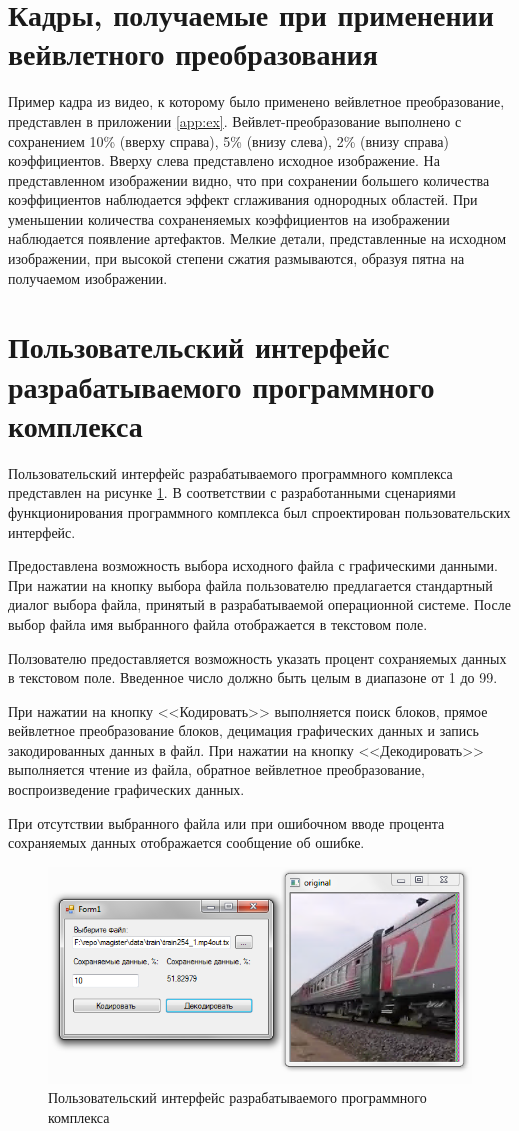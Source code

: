 \section{Кадры, получаемые при применении вейвлетного преобразования}
Пример кадра из видео, к которому было применено вейвлетное преобразование, представлен в приложении \ref{app:ex}.
Вейвлет-преобразование выполнено с сохранением 10\% (вверху справа), 5\% (внизу слева), 2\% (внизу справа) коэффициентов. 
Вверху слева представлено исходное изображение. На представленном изображении видно, что при сохранении большего количества коэффициентов
наблюдается эффект сглаживания однородных областей. При уменьшении количества сохраненяемых коэффициентов на изображении наблюдается появление 
артефактов. Мелкие детали, представленные на исходном изображении, при высокой степени сжатия размываются, образуя пятна на получаемом изображении.

\section{Пользовательский интерфейс разрабатываемого программного комплекса}
Пользовательский интерфейс разрабатываемого программного комплекса представлен на рисунке \ref{fig:ui}.
В соответствии с разработанными сценариями функционирования программного комплекса был спроектирован пользовательских интерфейс.

Предоставлена возможность выбора исходного файла с графическими данными. При нажатии на кнопку выбора файла пользователю предлагается 
стандартный диалог выбора файла, принятый в разрабатываемой операционной системе. После выбор файла имя выбранного файла отображается в 
текстовом поле. 

Ползователю предоставляется возможность указать процент сохраняемых данных в текстовом поле. Введенное число должно быть целым в диапазоне от 1 до 99.

При нажатии на кнопку <<Кодировать>> выполняется поиск блоков, прямое вейвлетное преобразование блоков, децимация графических данных и запись закодированных данных в файл.
При нажатии на кнопку <<Декодировать>> выполняется чтение из файла, обратное вейвлетное преобразование, воспроизведение графических данных.

При отсутствии выбранного файла или при ошибочном вводе процента сохраняемых данных отображается сообщение об ошибке.

\begin{figure}
  \centering
  \includegraphics[scale=0.75]{inc/graphics/ui.png}
  \caption{Пользовательский интерфейс разрабатываемого программного комплекса}
  \label{fig:ui}
\end{figure}
